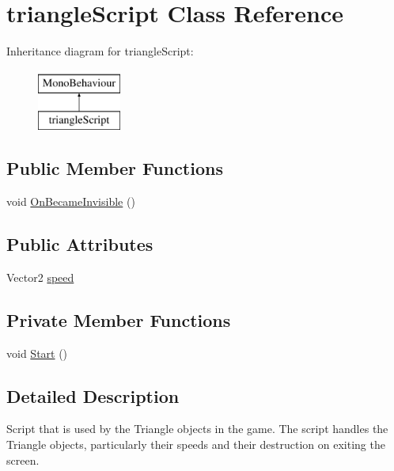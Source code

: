 \hypertarget{classtriangle_script}{}\section{triangle\+Script Class Reference}
\label{classtriangle_script}
Inheritance diagram for triangle\+Script\+:\begin{figure}[H]
\begin{center}
\leavevmode
\includegraphics[height=2.000000cm]{classtriangle_script}
\end{center}
\end{figure}
\subsection*{Public Member Functions}
\begin{DoxyCompactItemize}
\item 
void \hyperlink{classtriangle_script_a6deb98a0bb688a322a75d03e61e6e5e8}{On\+Became\+Invisible} ()
\end{DoxyCompactItemize}
\subsection*{Public Attributes}
\begin{DoxyCompactItemize}
\item 
Vector2 \hyperlink{classtriangle_script_a6bfdbe74d4572da3bac0362003649747}{speed}
\end{DoxyCompactItemize}
\subsection*{Private Member Functions}
\begin{DoxyCompactItemize}
\item 
void \hyperlink{classtriangle_script_ab63e77d33e9bd070628898b9926a7dad}{Start} ()
\end{DoxyCompactItemize}


\subsection{Detailed Description}
Script that is used by the Triangle objects in the game. The script handles the Triangle objects, particularly their speeds and their destruction on exiting the screen. 

